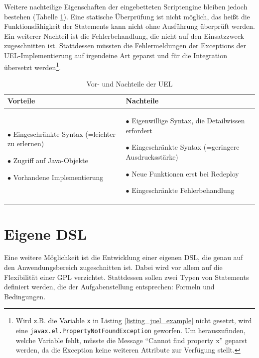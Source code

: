 Weitere nachteilige Eigenschaften der eingebetteten Scriptengine bleiben jedoch bestehen (Tabelle \ref{tbl_vergleich_uel}). Eine statische Überprüfung ist nicht möglich, das heißt die Funktionsfähigkeit der Statements kann nicht ohne Aus\-führ\-ung überprüft werden. Ein weiterer Nachteil ist die Fehlerbehandlung, die nicht auf den Einsatzzweck zugeschnitten ist. Stattdessen müssten die Fehlermeldungen der Exceptions der UEL-Implementierung auf irgendeine Art geparst und für die Integration übersetzt werden\footnote{Wird z.B. die Variable \texttt{x} in Listing \ref{listing_juel_example} nicht gesetzt, wird eine \texttt{javax.el.PropertyNotFoundException} geworfen. Um herauszufinden, welche Variable fehlt, müsste die Message ``Cannot find property x'' geparst werden, da die Exception keine weiteren Attribute zur Verfügung stellt.}.


\begin{table}
\begin{tabular}{|p{} | p{} |}
	\hline
	Vorteile & Nachteile \\
	\hline
	
		$\bullet$  Eingeschränkte Syntax (=leichter zu erlernen)
		 
		$\bullet$  Zugriff auf Java-Objekte
		 
		$\bullet$  Vorhandene Implementierung
	&
	
		$\bullet$  Eigenwillige Syntax, die Detailwissen erfordert
	
		$\bullet$  Eingeschränkte Syntax (=geringere Ausdrucksstärke)
		
		$\bullet$  Neue Funktionen erst bei Redeploy
	
		$\bullet$ Eingeschränkte Fehlerbehandlung
	
	\\
	\hline

\end{tabular}
\caption{Vor- und Nachteile der UEL}
\label{tbl_vergleich_uel}
\end{table}


\section{Eigene DSL}

Eine weitere Möglichkeit ist die Entwicklung einer eigenen DSL, die genau auf den Anwendungsbereich zugeschnitten ist. Dabei wird vor allem auf die Flexibilität einer GPL verzichtet. Stattdessen sollen zwei Typen von Statements definiert werden, die der Aufgabenstellung entsprechen: Formeln und Bedingungen.

